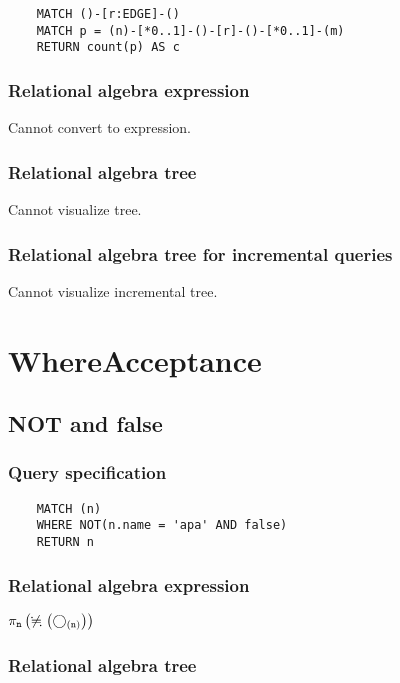 	\begin{lstlisting}
	MATCH ()-[r:EDGE]-()
	MATCH p = (n)-[*0..1]-()-[r]-()-[*0..1]-(m)
	RETURN count(p) AS c
	\end{lstlisting}


	\subsubsection*{Relational algebra expression}

	Cannot convert to expression.

	\subsubsection*{Relational algebra tree}

	Cannot visualize tree.

	\subsubsection*{Relational algebra tree for incremental queries}

	Cannot visualize incremental tree.

	\section{WhereAcceptance}

	\subsection{NOT and false}

	\subsubsection*{Query specification}

	\begin{lstlisting}
	MATCH (n)
	WHERE NOT(n.name = 'apa' AND false)
	RETURN n
	\end{lstlisting}


	\subsubsection*{Relational algebra expression}

	$\projection{\var{n}} \left(\alldifferent{} \left(\getvertices{n}{}\right)\right)$

	\subsubsection*{Relational algebra tree}


